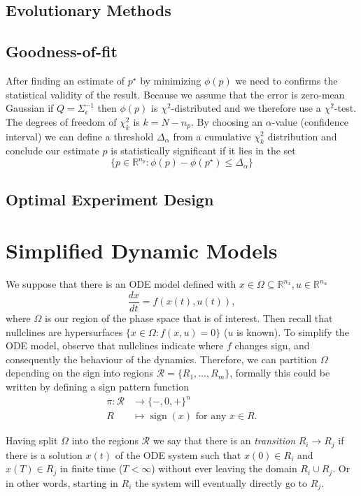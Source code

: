 \documentclass[a4paper]{article}
\DeclareMathOperator{\sign}{sign}
\theoremstyle{plain}
\theoremstyle{definition}
\theoremstyle{remark}
\begin{document}
\subsection{Evolutionary Methods}


\subsection{Goodness-of-fit}

After finding an estimate of $p^\star$ by minimizing $\phi(p)$ we need to
confirms the statistical validity of the result. Because we assume that the
error is zero-mean Gaussian if $Q = \Sigma_\epsilon^{-1}$ then $\phi(p)$ is
$\chi^2$-distributed and we therefore use a $\chi^2$-test. The degrees of
freedom of $\chi^2_k$ is $k = N - n_p$. By choosing an $\alpha$-value
(confidence interval) we can define a threshold $\Delta_\alpha$ from a
cumulative $\chi_k^2$ distribution and conclude our estimate $p$ is
statistically significant if it lies in the set
\[
  \{ p \in \mathbb{R}^{n_p} : \phi(p) - \phi(p^\star) \leq \Delta_\alpha \}
\]

\subsection{Optimal Experiment Design}

\clearpage

\section{Simplified Dynamic Models}

We suppose that there is an ODE model defined with $x \in \Omega \subseteq
\mathbb{R}^{n_x}, u \in \mathbb{R}^{n_u}$
\[
  \frac{dx}{dt} = f(x(t), u(t)),
\]
where $\Omega$ is our region of the phase space that is of interest. Then
recall that nullclines are hypersurfaces $\{x \in \Omega : f(x, u) = 0\}$ ($u$
is known). To simplify the ODE model, observe that nullclines indicate where
$f$ changes sign, and consequently the behaviour of the dynamics. Therefore,
we can partition $\Omega$ depending on the sign into regions $\mathcal{R} =
\{R_1, \ldots, R_m\}$, formally this could be written by defining a sign
pattern function
\begin{align*}
  \pi: \mathcal{R} &\to \{-,0,+\}^n \\
    R &\mapsto \sign(x) \text{ for any } x \in R.
\end{align*}

Having split $\Omega$ into the regions $\mathcal{R}$ we say that there is an
\emph{transition} $R_i \to R_j$ if there is a solution $x(t)$ of the ODE
system such that $x(0) \in R_i$ and $x(T) \in R_j$ in finite time ($T <
\infty$) without ever leaving the domain $R_i \cup R_j$. Or in other words,
starting in $R_i$ the system will eventually directly go to $R_j$.
\end{document}
